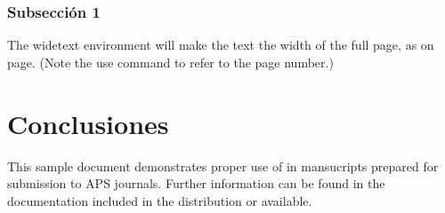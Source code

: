 \documentclass[%
 reprint,
 amsmath,amssymb,
 aps,
]{revtex4-2}
\begin{document}
\subsubsection{Subsección 1}
The widetext environment will make the text the width of the
full page, as on page. (Note the use command to refer to the page number.) 

\section{\label{sec:level1}Conclusiones}

This sample document demonstrates proper \cite{ZS71} use of in mansucripts prepared for submission to APS journals. Further information can be found in the documentation included in the distribution or available.

\end{document}
